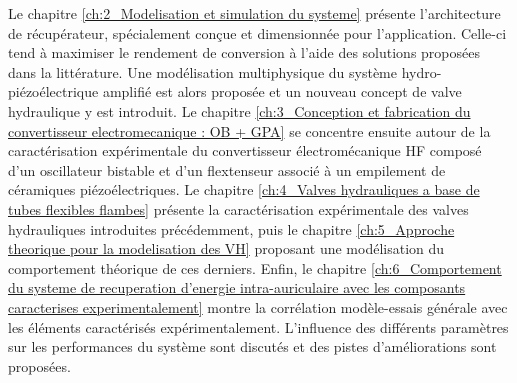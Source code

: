 Le chapitre \ref{ch:2_Modelisation et simulation du systeme} présente l'architecture de récupérateur, spécialement conçue et dimensionnée pour l'application. Celle-ci tend à maximiser le rendement de conversion à l'aide des solutions proposées dans la littérature. Une modélisation multiphysique du système hydro-piézoélectrique amplifié est alors proposée et un nouveau concept de valve hydraulique y est introduit.
Le chapitre \ref{ch:3_Conception et fabrication du convertisseur electromecanique : OB + GPA} se concentre ensuite autour de la caractérisation expérimentale du convertisseur électromécanique HF composé d'un oscillateur bistable et d'un flextenseur associé à un empilement de céramiques piézoélectriques. Le chapitre \ref{ch:4_Valves hydrauliques a base de tubes flexibles flambes} présente la caractérisation expérimentale des valves hydrauliques introduites précédemment, puis le chapitre \ref{ch:5_Approche theorique pour la modelisation des VH} proposant une modélisation du comportement théorique de ces derniers. Enfin, le chapitre \ref{ch:6_Comportement du systeme de recuperation d’energie intra-auriculaire avec les composants caracterises experimentalement} montre la corrélation modèle-essais générale avec les éléments caractérisés expérimentalement. L'influence des différents paramètres sur les performances du système sont discutés et des pistes d'améliorations sont proposées.













